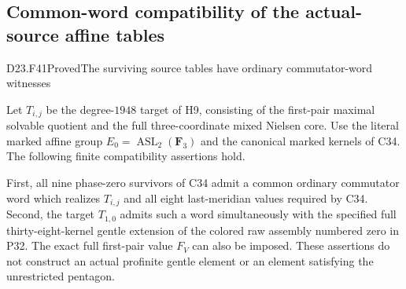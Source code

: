\subsection{Common-word compatibility of the actual-source affine tables}

\begin{statement}{D23.F41}{Proved}{The surviving source tables have ordinary commutator-word witnesses}
\end{statement}
Let $T_{i,j}$ be the degree-$1948$ target of H9, consisting
of the first-pair maximal solvable quotient and the full
three-coordinate mixed Nielsen core. Use the literal marked
affine group $E_0=\operatorname{ASL}_2(\mathbf F_3)$ and the
canonical marked kernels of C34. The following finite
compatibility assertions hold.

First, all nine phase-zero survivors of C34 admit a common
ordinary commutator word which realizes $T_{i,j}$ and all
eight last-meridian values required by C34. Second, the
target $T_{1,0}$ admits such a word simultaneously with the
specified full thirty-eight-kernel gentle extension of the
colored raw assembly numbered zero in P32. The exact full
first-pair value $F_V$ can also be imposed. These assertions
do not construct an actual profinite gentle element or an
element satisfying the unrestricted pentagon.

